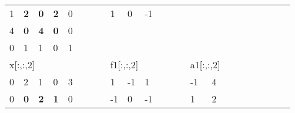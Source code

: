 \begin{table}[h]
{\begin{tabular}{lllllllllllllllllllllll}
\multicolumn{1}{|l|}{1} & \multicolumn{1}{l|}{\textbf{2}} & \multicolumn{1}{l|}{\textbf{0}} & \multicolumn{1}{l|}{\textbf{2}} & \multicolumn{1}{l|}{0} &  &  & \multicolumn{1}{l|}{} & \multicolumn{1}{l|}{1}  & \multicolumn{1}{l|}{0}  & \multicolumn{1}{l|}{-1} &  &  &                       &                         &                        &  &  &                       &                        &                         &  &  \\ \cline{1-5} \cline{9-11}
\multicolumn{1}{|l|}{4} & \multicolumn{1}{l|}{\textbf{0}} & \multicolumn{1}{l|}{\textbf{4}} & \multicolumn{1}{l|}{\textbf{0}} & \multicolumn{1}{l|}{0} &  &  &                       &                         & \textbf{}               & \textbf{}               &  &  &                       &                         &                        &  &  &                       &                        &                         &  &  \\ \cline{1-5}
\multicolumn{1}{|l|}{0} & \multicolumn{1}{l|}{1}          & \multicolumn{1}{l|}{1}          & \multicolumn{1}{l|}{0}          & \multicolumn{1}{l|}{1} &  &  &                       &                         &                         &                         &  &  &                       &                         &                        &  &  &                       &                        &                         &  &  \\ \cline{1-5}
\multicolumn{5}{l}{x{[}:,:,2{]}}                                                                                                                       &  &  &                       & \multicolumn{3}{l}{f1{[}:,:,2{]}}                                           &  &  &                       & \multicolumn{2}{l}{a1{[}:,:,2{]}}                &  &  &                       &                        &                         &  &  \\ \cline{1-5} \cline{9-11} \cline{15-16}
\multicolumn{1}{|l|}{0} & \multicolumn{1}{l|}{2}          & \multicolumn{1}{l|}{1}          & \multicolumn{1}{l|}{0}          & \multicolumn{1}{l|}{3} &  &  & \multicolumn{1}{l|}{} & \multicolumn{1}{l|}{1}  & \multicolumn{1}{l|}{-1} & \multicolumn{1}{l|}{1}  &  &  & \multicolumn{1}{l|}{} & \multicolumn{1}{l|}{-1} & \multicolumn{1}{l|}{4} &  &  &                       &                        &                         &  &  \\ \cline{1-5} \cline{9-11} \cline{15-16}
\multicolumn{1}{|l|}{0} & \multicolumn{1}{l|}{\textbf{0}} & \multicolumn{1}{l|}{\textbf{2}} & \multicolumn{1}{l|}{\textbf{1}} & \multicolumn{1}{l|}{0} &  &  & \multicolumn{1}{l|}{} & \multicolumn{1}{l|}{-1} & \multicolumn{1}{l|}{0}  & \multicolumn{1}{l|}{-1} &  &  & \multicolumn{1}{l|}{} & \multicolumn{1}{l|}{1}  & \multicolumn{1}{l|}{2} &  &  &                       &                        &                         &  &  \\ \cline{1-5} \cline{9-11} \cline{15-16}

\end{tabular}}
\end{table}

